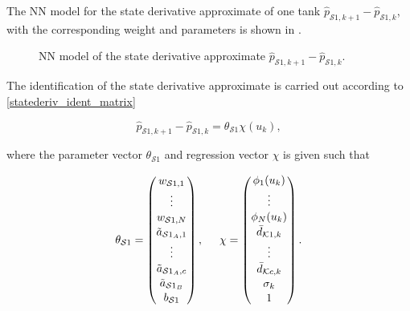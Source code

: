 The NN model for the state derivative approximate of one tank $\hat{p}_{\mathcal{S}1,k+1} \! - \! \hat{p}_{\mathcal{S}1,k}$, with the corresponding weight and parameters is shown in .

 \begin{figure}[H]
 \centering
  
 \caption{NN model of the state derivative approximate $\hat{p}_{\mathcal{S}1,k+1} \! - \! \hat{p}_{\mathcal{S}1,k}$.}
 \label{fig:nn_state}
 \end{figure}

 \vspace{-3mm}

The identification of the state derivative approximate is carried out according to \eqref{statederiv_ident_matrix}

  \begin{equation}
\label{statederiv_ident_matrix}
\hat{p}_{\mathcal{S}1,k+1} - \hat{p}_{\mathcal{S}1,k} = \theta_{{\mathcal{S}1}} \chi(u_k),
\end{equation}

where the parameter vector $\theta_{{\mathcal{S}1}}$ and regression vector $\chi$ is given such that

  \begin{equation}
\label{par_regr_matrix1}
\theta_{\mathcal{S}1} = 
          \begin{pmatrix}
           w_{\mathcal{S}1,1}  \\[1pt]
           \vdots  \\[1pt]
           w_{\mathcal{S}1,N}  \\[1pt]
           \tilde{a}_{\mathcal{S}1_A,1} \\[1pt]
           \vdots \\[1pt]
           \tilde{a}_{\mathcal{S}1_A,c} \\[1pt]
           \tilde{a}_{\mathcal{S}1_B} \\[1pt]
           b_{\mathcal{S}1} \\[1pt]
         \end{pmatrix}
         ,
         \hspace{5mm}
         \chi = 
         \begin{pmatrix}
           \phi_{1}(u_k)  \\[1pt]
           \vdots  \\[1pt]
           \phi_{N}(u_k)  \\[1pt]
           \bar{d}_{\mathcal{K}1,k} \\[1pt]
           \vdots  \\[1pt]
           \bar{d}_{\mathcal{K}c,k} \\[1pt]
           \sigma_k \\[1pt]
           1 \\[1pt]
         \end{pmatrix}.
\end{equation}

